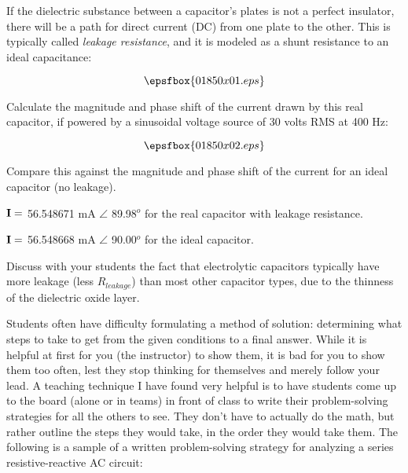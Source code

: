 

If the dielectric substance between a capacitor's plates is not a perfect insulator, there will be a path for direct current (DC) from one plate to the other.  This is typically called {\it leakage resistance}, and it is modeled as a shunt resistance to an ideal capacitance:

$$\epsfbox{01850x01.eps}$$

Calculate the magnitude and phase shift of the current drawn by this real capacitor, if powered by a sinusoidal voltage source of 30 volts RMS at 400 Hz:

$$\epsfbox{01850x02.eps}$$

Compare this against the magnitude and phase shift of the current for an ideal capacitor (no leakage).







${\bf I} =$ 56.548671 mA $\angle$ 89.98$^{o}$ for the real capacitor with leakage resistance.

${\bf I} =$ 56.548668 mA $\angle$ 90.00$^{o}$ for the ideal capacitor.







Discuss with your students the fact that electrolytic capacitors typically have more leakage (less $R_{leakage}$) than most other capacitor types, due to the thinness of the dielectric oxide layer.

\vskip 10pt

Students often have difficulty formulating a method of solution: determining what steps to take to get from the given conditions to a final answer.  While it is helpful at first for you (the instructor) to show them, it is bad for you to show them too often, lest they stop thinking for themselves and merely follow your lead.  A teaching technique I have found very helpful is to have students come up to the board (alone or in teams) in front of class to write their problem-solving strategies for all the others to see.  They don't have to actually do the math, but rather outline the steps they would take, in the order they would take them.  The following is a sample of a written problem-solving strategy for analyzing a series resistive-reactive AC circuit:

